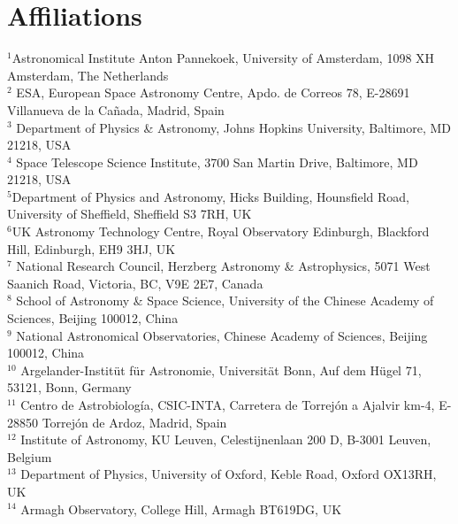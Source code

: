 \documentclass[a4paper,fleqn,usenatbib]{mnras}
\begin{document}
\section*{Affiliations}
\noindent $^{1}${Astronomical Institute Anton Pannekoek, University of
    Amsterdam, 1098 XH Amsterdam, The Netherlands} \\
  $^{2}$ {ESA, European Space Astronomy Centre, Apdo. de Correos 78,
    E-28691 Villanueva de la Ca\~nada, Madrid, Spain} \\
 $^{3}$ {
 Department of Physics \& Astronomy, Johns Hopkins University, Baltimore, MD 21218, USA}\\
  $^{4}$ {Space Telescope Science Institute, 3700 San Martin Drive,
    Baltimore, MD 21218, USA}\\
  $^{5}${Department of Physics and Astronomy, Hicks Building,
    Hounsfield Road, University of Sheffield, Sheffield S3 7RH, UK}\\
  $^{6}${UK Astronomy Technology Centre, Royal Observatory Edinburgh, Blackford Hill, Edinburgh, EH9 3HJ, UK}\\
  $^{7}$ {National Research Council, Herzberg Astronomy \&
    Astrophysics, 5071 West Saanich Road, Victoria, BC, V9E 2E7,
    Canada}\\
  $^{8}$ {School of Astronomy \& Space Science, University of the Chinese
    Academy of Sciences, Beijing 100012, China}\\
  $^{9}$ {National Astronomical Observatories, Chinese Academy of
    Sciences, Beijing 100012, China}\\
  $^{10}$ {Argelander-Instit\"ut f\"ur Astronomie, Universit\"at Bonn,
    Auf dem H\"ugel 71, 53121, Bonn, Germany}\\
  $^{11}$ {Centro de Astrobiología, CSIC-INTA, Carretera de Torrej\'on a Ajalvir km-4, E-28850 Torrej\'on de Ardoz, Madrid, Spain}\\
  $^{12}$ {Institute of Astronomy, KU Leuven, Celestijnenlaan 200 D, B-3001 Leuven, Belgium}\\
  $^{13}$ {Department of Physics, University of Oxford, Keble Road,
    Oxford OX13RH, UK} \\
  $^{14}$ {Armagh Observatory, College Hill, Armagh BT619DG, UK}\\

  
\end{document}
